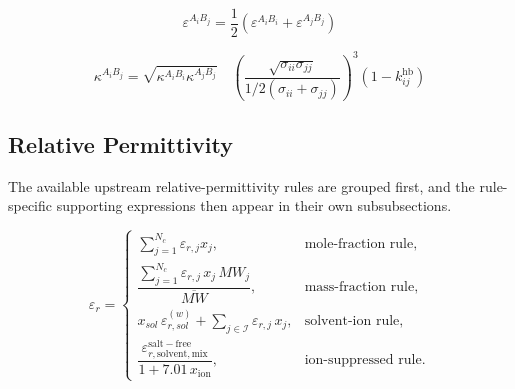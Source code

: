 \documentclass[12pt, letterpaper]{article}
\begin{document}

\begin{equation}
    \varepsilon^{A_{i}B_{j}}=\frac{1}{2}(\varepsilon^{A_{i}B_{i}}+\varepsilon^{A_{j}B_{j}})
    \label{eq:epsilon_assoc_mixing}
\end{equation}


\begin{equation}
    \kappa^{A_{i}B_{j}}=\sqrt{\kappa^{A_{i}B_{i}}\kappa^{A_{j}B_{j}}}\quad\left(\frac{\sqrt{\sigma_{ii}\sigma_{jj}}}{1/2(\sigma_{ii}+\sigma_{jj})}\right)^3(1-k_{ij}^{\mathrm{hb}})
    \label{eq:kappa_assoc_mixing}
\end{equation}

\subsection{Relative Permittivity}

The available upstream relative-permittivity rules are grouped first, and the rule-specific supporting expressions then appear in their own subsubsections.


\begin{equation}
    \varepsilon_{r}=
    \begin{cases}
        \sum_{j=1}^{N_{c}}\varepsilon_{r,j}x_{j}, & \text{mole-fraction rule}, \\[10pt]
        \dfrac{\sum_{j=1}^{N_{c}}\varepsilon_{r,j}\,x_{j}\,MW_{j}}{\overline{MW}}, & \text{mass-fraction rule}, \\[12pt]
        x_{sol}\,\varepsilon_{r,sol}^{(w)} + \sum_{j\in\mathcal I}\varepsilon_{r,j}\,x_{j}, & \text{solvent-ion rule}, \\[10pt]
        \dfrac{\varepsilon_{r,\mathrm{solvent,mix}}^{\mathrm{salt-free}}}{1+7.01\,x_{\mathrm{ion}}}, & \text{ion-suppressed rule}.
    \end{cases}
    \label{eq:epsr_mix_rule}
\end{equation}
\end{document}
